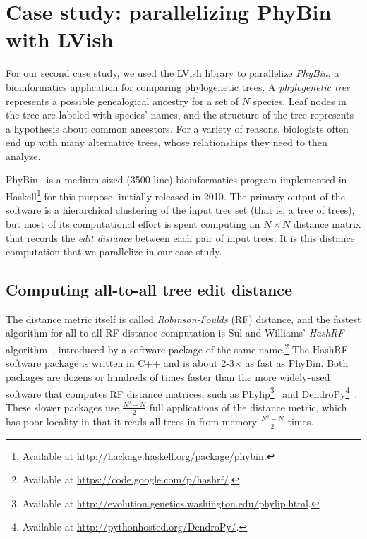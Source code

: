 \section{Case study: parallelizing PhyBin with LVish}\label{s:lvish-phybin}

For our second case study, we used the LVish library to parallelize
\emph{PhyBin}, a bioinformatics application for comparing phylogenetic
trees.  A \emph{phylogenetic tree} represents a possible genealogical
ancestry for a set of $N$ species.  Leaf nodes in the tree are labeled
with species' names, and the structure of the tree represents a
hypothesis about common ancestors. For a variety of reasons,
biologists often end up with many alternative trees, whose
relationships they need to then analyze.

PhyBin~\cite{PhyBin} is a medium-sized (3500-line) bioinformatics
program implemented in Haskell\footnote{Available at
  \url{http://hackage.haskell.org/package/phybin}.} for this purpose,
initially released in 2010.  The primary output of the software is a
hierarchical clustering of the input tree set (that is, a tree of
trees), but most of its computational effort is spent computing an $N
\times N$ distance matrix that records the \emph{edit distance}
between each pair of input trees.  It is this distance computation
that we parallelize in our case study.

\subsection{Computing all-to-all tree edit distance}

The distance metric itself is called \emph{Robinson-Foulds} (RF)
distance, and the fastest algorithm for all-to-all RF distance
computation is Sul and Williams' \emph{HashRF}
algorithm~\cite{hashrf}, introduced by a software package of the same
name.\footnote{Available at \url{https://code.google.com/p/hashrf/}.}
The HashRF software package is written in C++ and is about 2-3$\times$
as fast as PhyBin.  Both packages are dozens or hundreds of times
faster than the more widely-used software that computes RF distance
matrices, such as Phylip\footnote{Available at
  \url{http://evolution.genetics.washington.edu/phylip.html}.}~\cite{phylip}
and DendroPy\footnote{Available at
  \url{http://pythonhosted.org/DendroPy/}.}~\cite{dendropy}.  These
slower packages use $\frac{N^2-N}{2}$ full applications of the
distance metric, which has poor locality in that it reads all trees in
from memory $\frac{N^2-N}{2}$ times.

